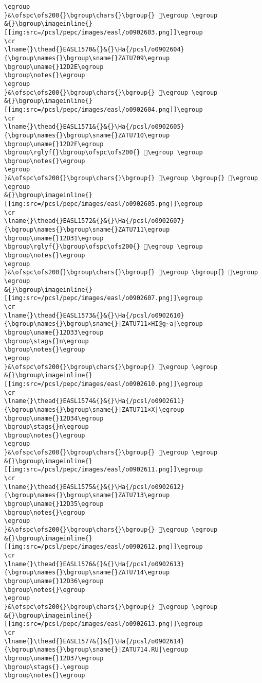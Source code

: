 \begin{verbatim}
\egroup
}&\ofspc\ofs200{}\bgroup\chars{}\bgroup{} 𒴭\egroup \egroup
&{}\bgroup\imageinline{}[[img:src=/pcsl/pepc/images/easl/o0902603.png]]\egroup
\cr
\lname{}\thead{}EASL1570&{}&{}\Ha{/pcsl/o0902604}{\bgroup\names{}\bgroup\sname{}ZATU709\egroup
\bgroup\uname{}12D2E\egroup
\bgroup\notes{}\egroup
\egroup
}&\ofspc\ofs200{}\bgroup\chars{}\bgroup{} 𒴮\egroup \egroup
&{}\bgroup\imageinline{}[[img:src=/pcsl/pepc/images/easl/o0902604.png]]\egroup
\cr
\lname{}\thead{}EASL1571&{}&{}\Ha{/pcsl/o0902605}{\bgroup\names{}\bgroup\sname{}ZATU710\egroup
\bgroup\uname{}12D2F\egroup
\bgroup\rglyf{}\bgroup\ofspc\ofs200{} 𒴯\egroup \egroup
\bgroup\notes{}\egroup
\egroup
}&\ofspc\ofs200{}\bgroup\chars{}\bgroup{} 𒴯\egroup \bgroup{} 𒴰\egroup \egroup
&{}\bgroup\imageinline{}[[img:src=/pcsl/pepc/images/easl/o0902605.png]]\egroup
\cr
\lname{}\thead{}EASL1572&{}&{}\Ha{/pcsl/o0902607}{\bgroup\names{}\bgroup\sname{}ZATU711\egroup
\bgroup\uname{}12D31\egroup
\bgroup\rglyf{}\bgroup\ofspc\ofs200{} 𒴱\egroup \egroup
\bgroup\notes{}\egroup
\egroup
}&\ofspc\ofs200{}\bgroup\chars{}\bgroup{} 𒴲\egroup \bgroup{} 𒴱\egroup \egroup
&{}\bgroup\imageinline{}[[img:src=/pcsl/pepc/images/easl/o0902607.png]]\egroup
\cr
\lname{}\thead{}EASL1573&{}&{}\Ha{/pcsl/o0902610}{\bgroup\names{}\bgroup\sname{}|ZATU711×HI@g∼a|\egroup
\bgroup\uname{}12D33\egroup
\bgroup\stags{}n\egroup
\bgroup\notes{}\egroup
\egroup
}&\ofspc\ofs200{}\bgroup\chars{}\bgroup{} 𒴳\egroup \egroup
&{}\bgroup\imageinline{}[[img:src=/pcsl/pepc/images/easl/o0902610.png]]\egroup
\cr
\lname{}\thead{}EASL1574&{}&{}\Ha{/pcsl/o0902611}{\bgroup\names{}\bgroup\sname{}|ZATU711×X|\egroup
\bgroup\uname{}12D34\egroup
\bgroup\stags{}n\egroup
\bgroup\notes{}\egroup
\egroup
}&\ofspc\ofs200{}\bgroup\chars{}\bgroup{} 𒴴\egroup \egroup
&{}\bgroup\imageinline{}[[img:src=/pcsl/pepc/images/easl/o0902611.png]]\egroup
\cr
\lname{}\thead{}EASL1575&{}&{}\Ha{/pcsl/o0902612}{\bgroup\names{}\bgroup\sname{}ZATU713\egroup
\bgroup\uname{}12D35\egroup
\bgroup\notes{}\egroup
\egroup
}&\ofspc\ofs200{}\bgroup\chars{}\bgroup{} 𒴵\egroup \egroup
&{}\bgroup\imageinline{}[[img:src=/pcsl/pepc/images/easl/o0902612.png]]\egroup
\cr
\lname{}\thead{}EASL1576&{}&{}\Ha{/pcsl/o0902613}{\bgroup\names{}\bgroup\sname{}ZATU714\egroup
\bgroup\uname{}12D36\egroup
\bgroup\notes{}\egroup
\egroup
}&\ofspc\ofs200{}\bgroup\chars{}\bgroup{} 𒴶\egroup \egroup
&{}\bgroup\imageinline{}[[img:src=/pcsl/pepc/images/easl/o0902613.png]]\egroup
\cr
\lname{}\thead{}EASL1577&{}&{}\Ha{/pcsl/o0902614}{\bgroup\names{}\bgroup\sname{}|ZATU714.RU|\egroup
\bgroup\uname{}12D37\egroup
\bgroup\stags{}.\egroup
\bgroup\notes{}\egroup

\end{verbatim}

